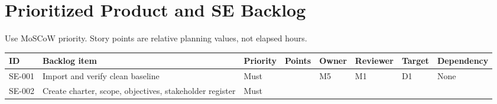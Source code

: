 \documentclass[
  10pt,
  a4paper,
  oneside]{report}
\newcounter{none} %
\begin{document}
\chapter{Prioritized Product and SE
Backlog}\label{11-prioritized-product-and-se-backlog}

Use MoSCoW priority. Story points are relative planning values, not
elapsed hours.

{\def\LTcaptype{none} %
\begin{longtable}[]{@{}
  >{\raggedright\arraybackslash}p{}
  >{\raggedright\arraybackslash}p{}
  >{\raggedright\arraybackslash}p{}
  >{\raggedleft\arraybackslash}p{}
  >{\raggedright\arraybackslash}p{}
  >{\raggedright\arraybackslash}p{}
  >{\raggedright\arraybackslash}p{}
  >{\raggedright\arraybackslash}p{}@{}}
\toprule\noalign{}
\begin{minipage}[b]{\linewidth}\raggedright
ID
\end{minipage} & \begin{minipage}[b]{\linewidth}\raggedright
Backlog item
\end{minipage} & \begin{minipage}[b]{\linewidth}\raggedright
Priority
\end{minipage} & \begin{minipage}[b]{\linewidth}\raggedleft
Points
\end{minipage} & \begin{minipage}[b]{\linewidth}\raggedright
Owner
\end{minipage} & \begin{minipage}[b]{\linewidth}\raggedright
Reviewer
\end{minipage} & \begin{minipage}[b]{\linewidth}\raggedright
Target
\end{minipage} & \begin{minipage}[b]{\linewidth}\raggedright
Dependency
\end{minipage} \\
\midrule\noalign{}
\endhead
\bottomrule\noalign{}
\endlastfoot
SE-001 & Import and verify clean baseline & Must & 3 & M5 & M1 & D1 &
None \\
SE-002 & Create charter, scope, objectives, stakeholder register & Must

\end{longtable}}
\end{document}
